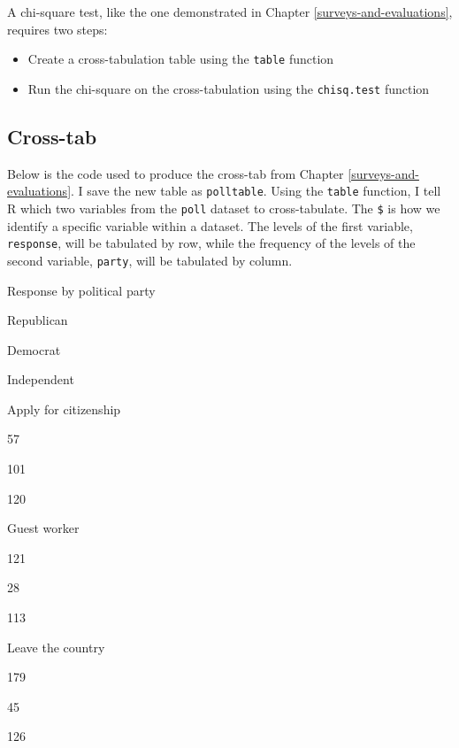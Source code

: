 \documentclass[
]{book}
\newenvironment{Shaded}{\begin{snugshade}}{\end{snugshade}}
\newcommand{\KeywordTok}[1]{\textcolor[rgb]{0.13,0.29,0.53}{\textbf{#1}}}
\newcommand{\NormalTok}[1]{#1}
\newcommand{\OperatorTok}[1]{\textcolor[rgb]{0.81,0.36,0.00}{\textbf{#1}}}
\newcommand{\StringTok}[1]{\textcolor[rgb]{0.31,0.60,0.02}{#1}}
\providecommand{\tightlist}{%
  \setlength{\itemsep}{0pt}\setlength{\parskip}{0pt}}
\begin{document}
A chi-square test, like the one demonstrated in Chapter \ref{surveys-and-evaluations}, requires two steps:

\begin{itemize}
\tightlist
\item
  Create a cross-tabulation table using the \texttt{table} function
\item
  Run the chi-square on the cross-tabulation using the \texttt{chisq.test} function
\end{itemize}

\hypertarget{cross-tab}{%
\subsection{Cross-tab}\label{cross-tab}}

Below is the code used to produce the cross-tab from Chapter \ref{surveys-and-evaluations}. I save the new table as \texttt{polltable}. Using the \texttt{table} function, I tell R which two variables from the \texttt{poll} dataset to cross-tabulate. The \texttt{\$} is how we identify a specific variable within a dataset. The levels of the first variable, \texttt{response}, will be tabulated by row, while the frequency of the levels of the second variable, \texttt{party}, will be tabulated by column.

\begin{Shaded}
\end{Shaded}

\label{tab:unnamed-chunk-208}Response by political party

Republican

Democrat

Independent

Apply for citizenship

57

101

120

Guest worker

121

28

113

Leave the country

179

45

126
\end{document}
